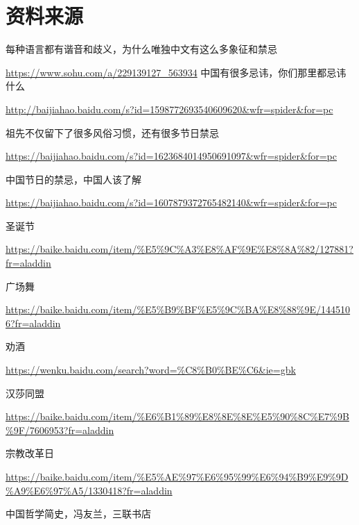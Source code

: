 \chapter{资料来源}
\setlength\parindent{0em}
\cnprolight
\mypar
每种语言都有谐音和歧义，为什么唯独中文有这么多象征和禁忌 

\url{https://www.sohu.com/a/229139127_563934} 
\mypar
中国有很多忌讳，你们那里都忌讳什么 

\url{http://baijiahao.baidu.com/s?id=1598772693540609620&wfr=spider&for=pc }

祖先不仅留下了很多风俗习惯，还有很多节日禁忌 

\url{https://baijiahao.baidu.com/s?id=1623684014950691097&wfr=spider&for=pc} 

中国节日的禁忌，中国人该了解 

\url{https://baijiahao.baidu.com/s?id=1607879372765482140&wfr=spider&for=pc}

圣诞节

\url{https://baike.baidu.com/item/%E5%9C%A3%E8%AF%9E%E8%8A%82/127881?fr=aladdin}

广场舞

\url{https://baike.baidu.com/item/%E5%B9%BF%E5%9C%BA%E8%88%9E/1445106?fr=aladdin}

劝酒

\url{https://wenku.baidu.com/search?word=%C8%B0%BE%C6&ie=gbk}

汉莎同盟

\url{https://baike.baidu.com/item/%E6%B1%89%E8%8E%8E%E5%90%8C%E7%9B%9F/7606953?fr=aladdin}

宗教改革日

\url{https://baike.baidu.com/item/%E5%AE%97%E6%95%99%E6%94%B9%E9%9D%A9%E6%97%A5/1330418?fr=aladdin}

中国哲学简史，冯友兰，三联书店
